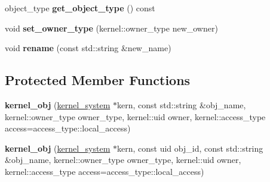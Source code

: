 \begin{DoxyCompactItemize}
object\+\_\+type {\bfseries get\+\_\+object\+\_\+type} () const
\item 
\mbox{\label{classeka2l1_1_1kernel_1_1kernel__obj_a21ea9ea2f1dc49871886bfe577af6fd9}} 
void {\bfseries set\+\_\+owner\+\_\+type} (kernel\+::owner\+\_\+type new\+\_\+owner)
\item 
\mbox{\label{classeka2l1_1_1kernel_1_1kernel__obj_a9edd7f20130b40e82dca0ecbb2485cce}} 
void {\bfseries rename} (const std\+::string \&new\+\_\+name)
\end{DoxyCompactItemize}
\subsection*{Protected Member Functions}
\begin{DoxyCompactItemize}
\item 
\mbox{\label{classeka2l1_1_1kernel_1_1kernel__obj_a221f80ef5222db0f6567db3937c54bd7}} 
{\bfseries kernel\+\_\+obj} (\mbox{\hyperlink{classeka2l1_1_1kernel__system}{kernel\+\_\+system}} $\ast$kern, const std\+::string \&obj\+\_\+name, kernel\+::owner\+\_\+type owner\+\_\+type, kernel\+::uid owner, kernel\+::access\+\_\+type access=access\+\_\+type\+::local\+\_\+access)
\item 
\mbox{\label{classeka2l1_1_1kernel_1_1kernel__obj_a5b1e6d7933d97fe485ed0c2d0348b4e4}} 
{\bfseries kernel\+\_\+obj} (\mbox{\hyperlink{classeka2l1_1_1kernel__system}{kernel\+\_\+system}} $\ast$kern, const uid obj\+\_\+id, const std\+::string \&obj\+\_\+name, kernel\+::owner\+\_\+type owner\+\_\+type, kernel\+::uid owner, kernel\+::access\+\_\+type access=access\+\_\+type\+::local\+\_\+access)
\end{DoxyCompactItemize}

